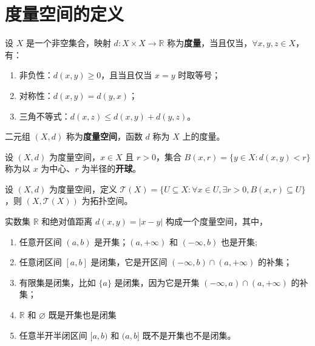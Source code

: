 \section{度量空间的定义}

\begin{definition}
    设 $ X $ 是一个非空集合，映射 $ d:X\times X\to \mathbb{R} $ 称为\textbf{度量}，当且仅当，$ \forall x,y,z\in X $，有：
    \begin{enumerate}
        \item 非负性：$ d(x,y)\geq 0 $，且当且仅当 $ x=y $ 时取等号；
        \item 对称性：$ d(x,y)=d(y,x) $；
        \item 三角不等式：$ d(x,z)\leq d(x,y)+d(y,z) $。
    \end{enumerate}
    二元组 $ (X,d) $ 称为\textbf{度量空间}，函数 $ d $ 称为 $ X $ 上的度量。
\end{definition}

\begin{definition}
    设 $ (X,d) $ 为度量空间，$ x\in X $ 且 $ r>0 $，集合 $ B(x,r)=\{y\in X:d(x,y)<r\} $ 称为以 $ x $ 为中心、$ r $ 为半径的\textbf{开球}。
\end{definition}

\begin{proposition}[度量空间诱导的拓扑]
    设 $ (X,d) $ 为度量空间，定义 $ \mathcal{T}(X)=\{U\subseteq X:\forall x\in U,\exists r>0,B(x,r)\subseteq U\} $，则 $ (X,\mathcal{T}(X)) $ 为拓扑空间。
\end{proposition}
\vspace{1em}

\begin{example}[实数集上的开集与闭集]
    实数集 $\mathbb{R}$ 和绝对值距离 $ d(x,y)=|x-y| $ 构成一个度量空间，其中，
    \begin{enumerate}
        \item 任意开区间 $ (a,b) $ 是开集；$(a,+\infty)$ 和 $(-\infty,b)$ 也是开集;
        \item 任意闭区间 $ [a,b] $ 是闭集，它是开区间 $(-\infty,b)\cap(a,+\infty)$ 的补集；
        \item 有限集是闭集，比如 $\{a\}$ 是闭集，因为它是开集 $(-\infty,a)\cap(a,+\infty)$ 的补集；
        \item $\mathbb{R}$ 和 $\varnothing$ 既是开集也是闭集
        \item 任意半开半闭区间 $ [a,b) $ 和 $ (a,b] $ 既不是开集也不是闭集。
    \end{enumerate}
\end{example}

\newpage